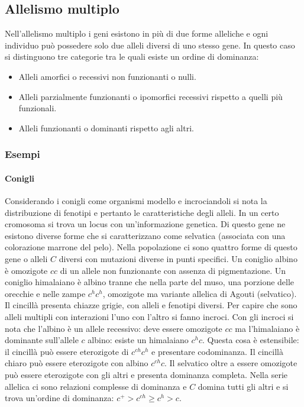 \subsection{Allelismo multiplo}
Nell'allelismo multiplo i geni esistono in pi\`u di due forme alleliche e ogni individuo pu\`o possedere solo due alleli diversi di uno stesso gene. In questo caso si distinguono
tre categorie tra le quali esiste un ordine di dominanza:
\begin{itemize}
	\item Alleli amorfici o recessivi non funzionanti o nulli.
	\item Alleli parzialmente funzionanti o ipomorfici recessivi rispetto a quelli pi\`u funzionali.
	\item Alleli funzionanti o dominanti rispetto agli altri.
\end{itemize}
\subsubsection{Esempi}
\paragraph{Conigli}
Considerando i conigli come organismi modello e incrociandoli si nota la distribuzione di fenotipi e pertanto le caratteristiche degli alleli. In un certo cromosoma si trova un locus
con un'informazione genetica. Di questo gene ne esistono diverse forme che si caratterizzano come selvatica (associata con una colorazione marrone del pelo). Nella popolazione ci sono 
quattro forme di questo gene o alleli $C$ diversi con mutazioni diverse in punti specifici. Un coniglio albino \`e omozigote $cc$ di un allele non funzionante con assenza di 
pigmentazione. Un coniglio himalaiano \`e albino tranne che nella parte del muso, una porzione delle orecchie e nelle zampe $c^hc^h$, omozigote ma variante allelica di Agouti 
(selvatico). Il cincill\`a presenta chiazze grigie, con alleli e fenotipi diversi. Per capire che sono alleli multipli con interazioni l'uno con l'altro si fanno incroci. Con gli incroci
si nota che l'albino \`e un allele recessivo: deve essere omozigote $cc$ ma l'himalaiano \`e dominante sull'allele $c$ albino: esiste un himalaiano $c^hc$. Questa cosa \`e estensibile: 
il cincill\`a pu\`o essere eterozigote di $c^{ch}c^h$ e presentare codominanza. Il cincill\`a chiaro pu\`o essere eterozigote con albino $c^{ch}c$. Il selvatico oltre a essere omozigote 
pu\`o essere eterozigote con gli altri e presenta dominanza completa. Nella serie allelica ci sono relazioni complesse di dominanza e $C$ domina tutti gli altri e si trova un'ordine di 
dominanza: $c^+>c^{ch}\ge c^h>c$. 
